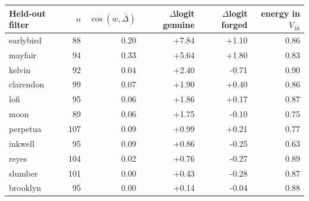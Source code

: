 \begin{tabular}{@{}lrrrrr@{}}
\toprule
Held-out filter & $n$ & $\cos(w,\bar\Delta)$ & $\Delta$logit genuine & $\Delta$logit forged & energy in $V_{16}$ \\
\midrule
earlybird & 88 & 0.20 & +7.84 & +1.10 & 0.86 \\
mayfair & 94 & 0.33 & +5.64 & +1.80 & 0.83 \\
kelvin & 92 & 0.04 & +2.40 & -0.71 & 0.90 \\
clarendon & 99 & 0.07 & +1.90 & +0.40 & 0.86 \\
lofi & 95 & 0.06 & +1.86 & +0.17 & 0.87 \\
moon & 89 & 0.06 & +1.75 & -0.10 & 0.75 \\
perpetua & 107 & 0.09 & +0.99 & +0.21 & 0.77 \\
inkwell & 95 & 0.09 & +0.86 & -0.25 & 0.63 \\
reyes & 104 & 0.02 & +0.76 & -0.27 & 0.89 \\
slumber & 101 & 0.00 & +0.43 & -0.28 & 0.87 \\
brooklyn & 95 & 0.00 & +0.14 & -0.04 & 0.88 \\
\bottomrule
\end{tabular}
